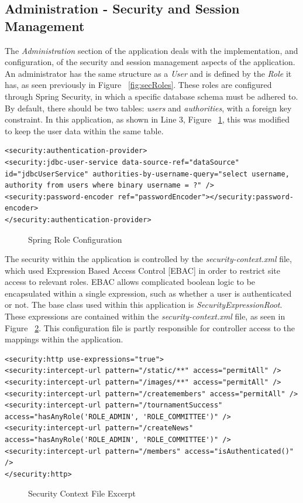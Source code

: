 	
\label{sec:adminImp}
\subsection{Administration - Security and Session Management}

The \textit{Administration} section of the application deals with the implementation, and configuration, of the security and session management aspects of the application. An administrator has the same structure as a \textit{User} and is defined by the \textit{Role} it has, as seen previously in Figure ~\ref{fig:secRoles}. These roles are configured through Spring Security, in which a specific database schema must be adhered to. By default, there should be two tables: \textit{users} and \textit{authorities}, with a foreign key constraint. In this application, as shown in Line 3, Figure ~\ref{fig:roleConfig}, this was modified to keep the user data within the same table.

\begin{lstlisting}
<security:authentication-provider>
<security:jdbc-user-service data-source-ref="dataSource"
id="jdbcUserService" authorities-by-username-query="select username, authority from users where binary username = ?" />
<security:password-encoder ref="passwordEncoder"></security:password-encoder>
</security:authentication-provider>
\end{lstlisting}
\begin{figure}[H]
\caption{Spring Role Configuration}
\label{fig:roleConfig}
\end{figure}

The security within the application is controlled by the \textit{security-context.xml} file, which used Expression Based Access Control [EBAC] in order to restrict site access to relevant roles. EBAC allows complicated boolean logic to be encapsulated within a single expression, such as whether a user is authenticated or not. The base class used within this application is \textit{SecurityExpressionRoot}. These expressions are contained within the \textit{security-context.xml} file, as seen in Figure ~\ref{fig:secContext}. This configuration file is partly responsible for controller access to the mappings within the application. 

\begin{lstlisting}
<security:http use-expressions="true">
<security:intercept-url pattern="/static/**" access="permitAll" />
<security:intercept-url pattern="/images/**" access="permitAll" />
<security:intercept-url pattern="/createmembers" access="permitAll" />
<security:intercept-url pattern="/tournamentSuccess" access="hasAnyRole('ROLE_ADMIN', 'ROLE_COMMITTEE')" />
<security:intercept-url pattern="/createNews" access="hasAnyRole('ROLE_ADMIN', 'ROLE_COMMITTEE')" />
<security:intercept-url pattern="/members" access="isAuthenticated()" />
</security:http>
\end{lstlisting}
\begin{figure}[H]
\caption{Security Context File Excerpt}
\label{fig:secContext}
\end{figure}

